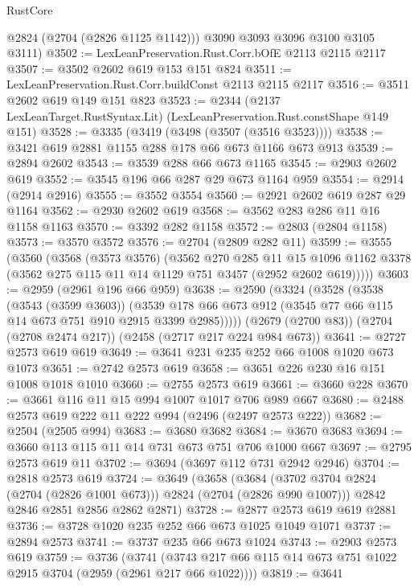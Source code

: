 \begin{lexlean}{RustCore}
\begin{coremodule}
        @2824
        (@2704 (@2826 @1125 @1142)))
      @3090
      @3093
      @3096
      @3100
      @3105
      @3111)
@3502 := LexLeanPreservation.Rust.Corr.bOfE @2113 @2115 @2117
@3507 := @3502 @2602 @619 @153 @151 @824
@3511 := LexLeanPreservation.Rust.Corr.buildConst @2113 @2115 @2117
@3516 := @3511 @2602 @619 @149 @151 @823
@3523 := @2344 (@2137 LexLeanTarget.RustSyntax.Lit) (LexLeanPreservation.Rust.constShape @149 @151)
@3528 := @3335 (@3419 (@3498 (@3507 (@3516 @3523))))
@3538 := @3421 @619 @2881 @1155 @288 @178 @66 @673 @1166 @673 @913
@3539 := @2894 @2602
@3543 := @3539 @288 @66 @673 @1165
@3545 := @2903 @2602 @619
@3552 := @3545 @196 @66 @287 @29 @673 @1164 @959
@3554 := @2914 (@2914 @2916)
@3555 := @3552 @3554
@3560 := @2921 @2602 @619 @287 @29 @1164
@3562 := @2930 @2602 @619
@3568 := @3562 @283 @286 @11 @16 @1158 @1163
@3570 := @3392 @282 @1158
@3572 := @2803 (@2804 @1158)
@3573 := @3570 @3572
@3576 := @2704 (@2809 @282 @11)
@3599 := @3555
    (@3560
      (@3568
        (@3573 @3576)
        (@3562
          @270
          @285
          @11
          @15
          @1096
          @1162
          @3378
          (@3562 @275 @115 @11 @14 @1129 @751 @3457 (@2952 @2602 @619)))))
@3603 := @2959 (@2961 @196 @66 @959)
@3638 := @2590
    (@3324
      (@3528
        (@3538
          (@3543 (@3599 @3603))
          (@3539 @178 @66 @673 @912 (@3545 @77 @66 @115 @14 @673 @751 @910 @2915 @3399 @2985)))))
    (@2679 (@2700 @83))
    (@2704 (@2708 @2474 @217))
    (@2458 (@2717 @217 @224 @984 @673))
@3641 := @2727 @2573 @619 @619
@3649 := @3641 @231 @235 @252 @66 @1008 @1020 @673 @1073
@3651 := @2742 @2573 @619
@3658 := @3651 @226 @230 @16 @151 @1008 @1018 @1010
@3660 := @2755 @2573 @619
@3661 := @3660 @228
@3670 := @3661 @116 @11 @15 @994 @1007 @1017 @706 @989 @667
@3680 := @2488 @2573 @619 @222 @11 @222 @994 (@2496 (@2497 @2573 @222))
@3682 := @2504 (@2505 @994)
@3683 := @3680 @3682
@3684 := @3670 @3683
@3694 := @3660 @113 @115 @11 @14 @731 @673 @751 @706 @1000 @667
@3697 := @2795 @2573 @619 @11
@3702 := @3694 (@3697 @112 @731 @2942 @2946)
@3704 := @2818 @2573 @619
@3724 := @3649
    (@3658
      (@3684 (@3702 @3704 @2824 (@2704 (@2826 @1001 @673))) @2824 (@2704 (@2826 @990 @1007)))
      @2842
      @2846
      @2851
      @2856
      @2862
      @2871)
@3728 := @2877 @2573 @619 @619 @2881
@3736 := @3728 @1020 @235 @252 @66 @673 @1025 @1049 @1071
@3737 := @2894 @2573
@3741 := @3737 @235 @66 @673 @1024
@3743 := @2903 @2573 @619
@3759 := @3736
    (@3741 (@3743 @217 @66 @115 @14 @673 @751 @1022 @2915 @3704 (@2959 (@2961 @217 @66 @1022))))
@3819 := @3641

\end{coremodule}
\end{lexlean}
